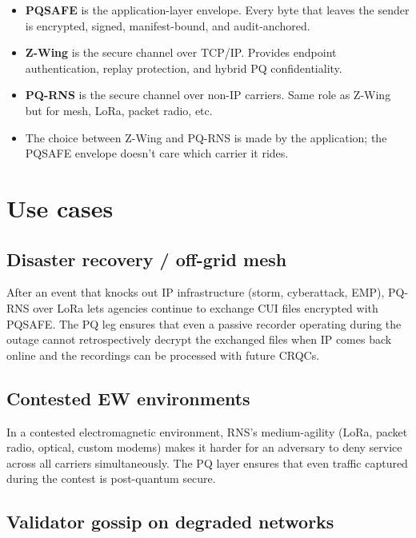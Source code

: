 \documentclass[11pt,a4paper]{article}
\begin{document}
\begin{itemize}[leftmargin=*,itemsep=0pt]
\item \textbf{PQSAFE} is the application-layer envelope. Every byte
  that leaves the sender is encrypted, signed, manifest-bound, and
  audit-anchored.
\item \textbf{Z-Wing} is the secure channel over TCP/IP. Provides
  endpoint authentication, replay protection, and hybrid PQ
  confidentiality.
\item \textbf{PQ-RNS} is the secure channel over non-IP carriers.
  Same role as Z-Wing but for mesh, LoRa, packet radio, etc.
\item The choice between Z-Wing and PQ-RNS is made by the application;
  the PQSAFE envelope doesn't care which carrier it rides.
\end{itemize}

\section{Use cases}
\label{sec:usecases}

\subsection{Disaster recovery / off-grid mesh}

After an event that knocks out IP infrastructure (storm, cyberattack,
EMP), PQ-RNS over LoRa lets agencies continue to exchange CUI files
encrypted with PQSAFE. The PQ leg ensures that even a passive recorder
operating during the outage cannot retrospectively decrypt the
exchanged files when IP comes back online and the recordings can be
processed with future CRQCs.

\subsection{Contested EW environments}

In a contested electromagnetic environment, RNS's medium-agility
(LoRa, packet radio, optical, custom modems) makes it harder for an
adversary to deny service across all carriers simultaneously. The PQ
layer ensures that even traffic captured during the contest is
post-quantum secure.

\subsection{Validator gossip on degraded networks}
\end{document}
